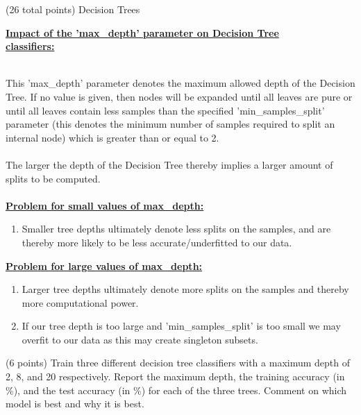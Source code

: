 \documentclass[12pt]{article}
\begin{document}
\begin{question}{(26 total points) Decision Trees}
\begin{subquestion}
\begin{answerbox}{32em}
\large{\textbf{\underline{Impact of the 'max\_depth' parameter on Decision Tree}}}\\
\large{\textbf{\underline{classifiers:}}}\\
\\
\normalsize{
This 'max\_depth' parameter denotes the maximum allowed depth of the Decision Tree. If no value is given, then nodes will be expanded until all leaves are pure or until all leaves contain less samples than the specified 'min\_samples\_split' parameter (this denotes the minimum number of samples required to split an internal node) which is greater than or equal to 2.\\
\\
The larger the depth of the Decision Tree thereby implies a larger amount of splits to be computed.\\
\\
\textbf{\underline{Problem for small values of max\_depth:}}
\begin{enumerate}
    \item Smaller tree depths ultimately denote less splits on the samples, and are thereby more likely to be less accurate/underfitted to our data.\\
\end{enumerate}
\textbf{\underline{Problem for large values of max\_depth:}}
\begin{enumerate}
    \item Larger tree depths ultimately denote more splits on the samples and thereby more computational power.
    \item If our tree depth is too large and 'min\_samples\_split' is too small we may overfit to our data as this may create singleton subsets.
\end{enumerate}
}
\end{answerbox}



\end{subquestion}


%
%
\begin{subquestion}{(6 points) 
Train three different decision tree classifiers with a maximum depth of 2, 8, and 20 respectively.
Report the maximum depth, the training accuracy (in \%), and the test accuracy (in \%) for each of the three trees.
Comment on which model is best and why it is best. \\
}



\end{subquestion}
\end{question}
\end{document}
